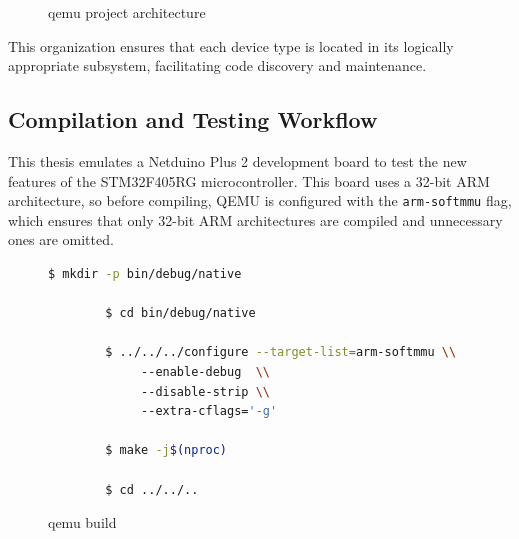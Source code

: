 \begin{figure}[H]
    \centering
    
    \begin{minipage}{0.9\textwidth}
    \end{minipage}

    \caption{qemu project architecture}
    \label{fig:qemu_project_arch}
\end{figure}


This organization ensures that each device type is located in its logically appropriate subsystem, facilitating code discovery and maintenance.

\subsection{Compilation and Testing Workflow}

This thesis emulates a Netduino Plus 2 development board to test the new features of the STM32F405RG microcontroller. This board uses a 32-bit ARM architecture, so before compiling, QEMU is configured with the \texttt{arm-softmmu} flag, which ensures that only 32-bit ARM architectures are compiled and unnecessary ones are omitted.

\begin{figure}[H]
    \centering
    \begin{lstlisting}[language=bash]
        $ mkdir -p bin/debug/native

        $ cd bin/debug/native
        
        $ ../../../configure --target-list=arm-softmmu \\
             --enable-debug  \\
             --disable-strip \\ 
             --extra-cflags='-g'

        $ make -j$(nproc)
        
        $ cd ../../..
    \end{lstlisting}
    \caption{qemu build}
    \label{fig:qemu_build}
\end{figure}

